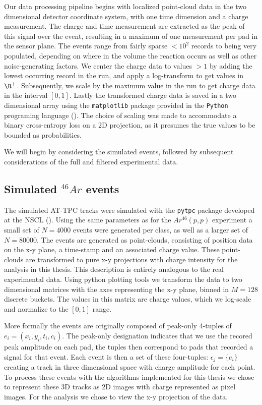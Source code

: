 Our data processing pipeline begins with localized point-cloud data in the two dimensional detector coordinate system, with one time dimension and a charge measurement. The charge and time measurement are extracted as the peak of this signal over the event, resulting in a maximum of one measurement per pad in the sensor plane. The events range from fairly sparse $< 10^2$ records to being very populated, depending on where in the volume the reaction occurs as well as other noise-generating factors. We center the charge data to values $>1$ by adding the lowest occurring record in the run, and apply a log-transform to get values in $\R^+$. Subsequently, we scale by the maximum value in the run to get charge data in the interval $[0, 1]$. Lastly the transformed charge data is saved in a two dimensional array using the \lstinline{matplotlib} package provided in the \lstinline{Python} programing language (\cite{matplotlib}). The choice of scaling was made to accommodate a binary cross-entropy loss on a 2D projection, as it presumes the true values to be bounded as probabilities.

We will begin by considering the simulated events, followed by subsequent considerations of the full and filtered experimental data.

\subsection{Simulated \texorpdfstring{${}^{46}Ar$}{46Ar}  events}\label{sec:data_sim}

The simulated AT-TPC tracks were simulated with the \lstinline{pytpc} package developed at the NSCL (\cite{Bradt2017a}). Using the same parameters as for the $Ar^{46}(p, p)$ experiment a small set of $N=4000$ events were generated per class, as well as a larger set of $N=80000$. The events are generated as point-clouds, consisting of position data on the x-y plane, a time-stamp and an associated charge value. These point-clouds are transformed to pure x-y projections with charge intensity for the analysis in this thesis. This description is entirely analogous to the real experimental data. Using python plotting tools we transform the data to two dimensional matrices with the axes representing the x-y plane, binned in $M=128$ discrete buckets. The values in this matrix are charge values, which we log-scale and normalize to the $[0, 1]$ range. 

More formally the events are originally composed of peak-only 4-tuples of $e_i = (x_i, y_i, t_i, c_i)$. The peak-only designation indicates that we use the recored peak amplitude on each pad, the tuples then correspond to pads that recorded a signal for that event. Each event is then a set of these four-tuples: $\epsilon_j = \{e_i\}$ creating a track in three dimensional space with charge amplitude for each point. To process these events with the algorithms implemented for this thesis we chose to represent these 3D tracks as 2D images with charge represented as pixel images. For the analysis we chose to view the x-y projection of the data.

